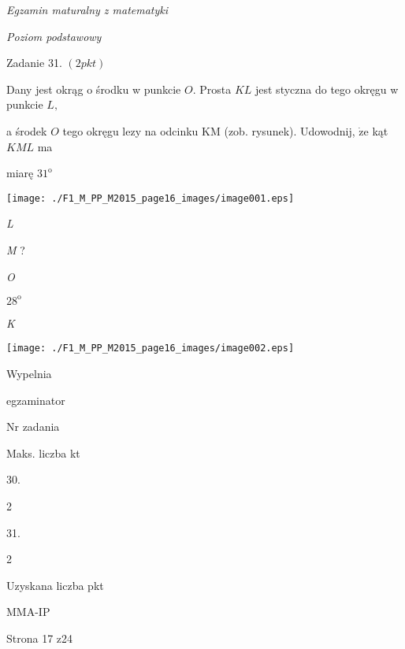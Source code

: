 \documentclass[a4paper,12pt]{article}
\begin{document}
{\it Egzamin maturalny z matematyki}

{\it Poziom podstawowy}

Zadanie 31. $(2pkt)$

Dany jest okrąg o środku w punkcie $O$. Prosta $KL$ jest styczna do tego okręgu w punkcie $L,$

a środek $O$ tego okręgu lezy na odcinku KM (zob. rysunek). Udowodnij, $\dot{\mathrm{z}}\mathrm{e}$ kąt $KML$ ma

miarę $31^{\mathrm{o}}$
\begin{center}
\texttt{[image: ./F1\_M\_PP\_M2015\_page16\_images/image001.eps]}
\end{center}
{\it L}

{\it M} ?

{\it O}

$28^{\mathrm{o}}$

{\it K}
\begin{center}
\texttt{[image: ./F1\_M\_PP\_M2015\_page16\_images/image002.eps]}
\end{center}
Wypelnia

egzaminator

Nr zadania

Maks. liczba kt

30.

2

31.

2

Uzyskana liczba pkt

MMA-IP

Strona 17 z24
\end{document}
